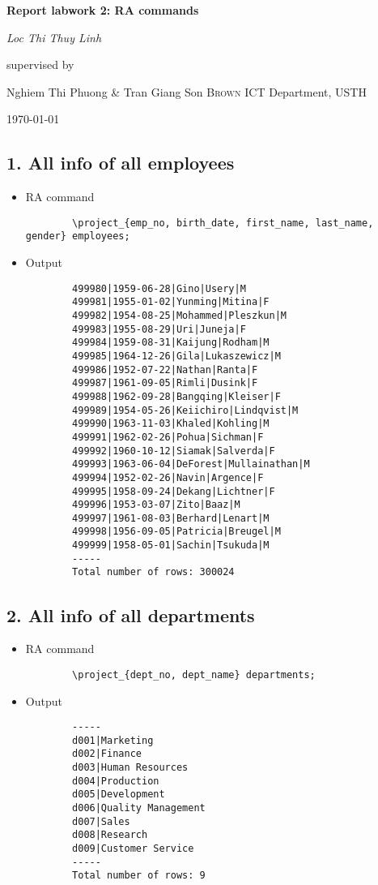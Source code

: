 \documentclass[13pt,a4paper]{report}
\begin{document}
\begin{titlepage}
	\centering
	\vspace{2cm}
	{\huge\bfseries Report labwork 2: RA commands \par}
	\vspace{2cm}
	{\Large\itshape Loc Thi Thuy Linh\par}
	\vfill
	supervised by\par
	Nghiem Thi Phuong \& Tran Giang Son \textsc{Brown}
	ICT Department, USTH\par
	\vfill
	{\large \today\par}
\end{titlepage}
\subsection*{1. All info of all employees}
\begin{itemize}
	\item RA command
	\begin{lstlisting}
		\project_{emp_no, birth_date, first_name, last_name, gender} employees;
	\end{lstlisting}

	\item Output
	\begin{lstlisting}
		499980|1959-06-28|Gino|Usery|M
		499981|1955-01-02|Yunming|Mitina|F
		499982|1954-08-25|Mohammed|Pleszkun|M
		499983|1955-08-29|Uri|Juneja|F
		499984|1959-08-31|Kaijung|Rodham|M
		499985|1964-12-26|Gila|Lukaszewicz|M
		499986|1952-07-22|Nathan|Ranta|F
		499987|1961-09-05|Rimli|Dusink|F
		499988|1962-09-28|Bangqing|Kleiser|F
		499989|1954-05-26|Keiichiro|Lindqvist|M
		499990|1963-11-03|Khaled|Kohling|M
		499991|1962-02-26|Pohua|Sichman|F
		499992|1960-10-12|Siamak|Salverda|F
		499993|1963-06-04|DeForest|Mullainathan|M
		499994|1952-02-26|Navin|Argence|F
		499995|1958-09-24|Dekang|Lichtner|F
		499996|1953-03-07|Zito|Baaz|M
		499997|1961-08-03|Berhard|Lenart|M
		499998|1956-09-05|Patricia|Breugel|M
		499999|1958-05-01|Sachin|Tsukuda|M
		-----
		Total number of rows: 300024

	\end{lstlisting}
\end{itemize}

\subsection*{2. All info of all departments}
\begin{itemize}
	\item RA command
	\begin{lstlisting}
		\project_{dept_no, dept_name} departments;
	\end{lstlisting}

	\item Output
	\begin{lstlisting}
		-----
		d001|Marketing
		d002|Finance
		d003|Human Resources
		d004|Production
		d005|Development
		d006|Quality Management
		d007|Sales
		d008|Research
		d009|Customer Service
		-----
		Total number of rows: 9
	\end{lstlisting}
\end{itemize}
\end{document}
